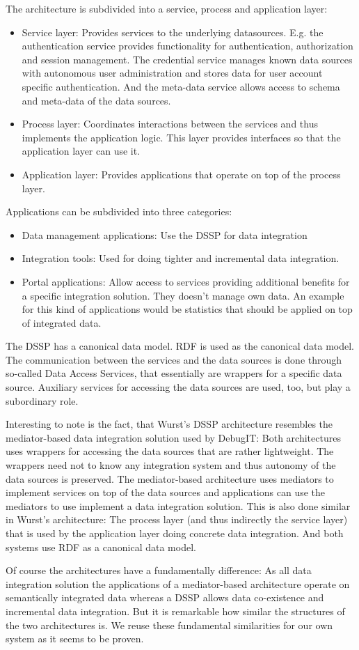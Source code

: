 The architecture is subdivided into a service, process and application layer:
\begin{itemize}
\item Service layer: Provides services to the underlying datasources. E.g. the authentication service provides functionality for authentication, authorization and session management. The credential service manages known data sources with autonomous user administration and stores data for user account specific authentication. And the meta-data service allows access to schema and meta-data of the data sources.
\item Process layer: Coordinates interactions between the services and thus implements the application logic. This layer provides interfaces so that the application layer can use it.
\item Application layer: Provides applications that operate on top of the process layer.
\end{itemize}

Applications can be subdivided into three categories:
\begin{itemize}
\item Data management applications: Use the DSSP for data integration
\item Integration tools: Used for doing tighter and incremental data integration.
\item Portal applications: Allow access to services providing additional benefits for a specific integration solution. They doesn't manage own data.
An example for this kind of applications would be statistics that should be applied on top of integrated data.
\end{itemize}

The DSSP has a canonical data model. RDF is used as the canonical data model. 
The communication between the services and the data sources is done through so-called Data Access Services, that essentially are wrappers for a specific data source. Auxiliary services for accessing the data sources are used, too, but play a subordinary role. 

Interesting to note is the fact, that Wurst's DSSP architecture resembles the mediator-based data integration solution used by DebugIT: Both architectures uses wrappers for accessing the data sources that are rather lightweight. The wrappers need not to know any integration system and thus autonomy of the data sources is preserved. The mediator-based architecture uses mediators to implement services on top of the data sources and applications can use the mediators to use implement a data integration solution. This is also done similar in Wurst's architecture: The process layer (and thus indirectly the service layer) that is used by the application layer doing concrete data integration. And both systems use RDF as a canonical data model.

Of course the architectures have a fundamentally difference: As all data integration solution the applications of a mediator-based architecture operate on semantically integrated data whereas a DSSP allows data co-existence and incremental data integration.
But it is remarkable how similar the structures of the two architectures is. We reuse these fundamental similarities for our own system as it seems to be proven.